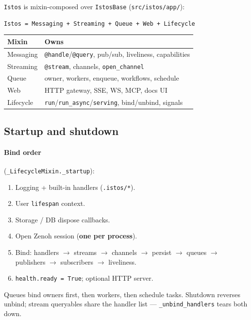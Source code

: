 \documentclass[11pt,a4paper]{article}
\begin{document}
\texttt{Istos} is mixin-composed over \texttt{IstosBase}
(\texttt{src/istos/app/}):

\begin{center}
\large\texttt{Istos = Messaging + Streaming + Queue + Web + Lifecycle}
\end{center}

\begin{tabularx}{\textwidth}{@{}lX@{}}
\toprule
\textbf{Mixin} & \textbf{Owns} \\
\midrule
Messaging & \texttt{@handle}/\texttt{@query}, pub/sub, liveliness, capabilities \\
Streaming & \texttt{@stream}, channels, \texttt{open\_channel} \\
Queue & owner, workers, enqueue, workflows, schedule \\
Web & HTTP gateway, SSE, WS, MCP, docs UI \\
Lifecycle & \texttt{run}/\texttt{run\_async}/\texttt{serving}, bind/unbind, signals \\
\bottomrule
\end{tabularx}

\subsection{Startup and shutdown}

\paragraph{Bind order} (\texttt{\_LifecycleMixin.\_startup}):
\begin{enumerate}[leftmargin=*,itemsep=1pt]
  \item Logging + built-in handlers (\texttt{.istos/*}).
  \item User \texttt{lifespan} context.
  \item Storage / DB dispose callbacks.
  \item Open Zenoh session (\textbf{one per process}).
  \item Bind: handlers $\to$ streams $\to$ channels $\to$ persist $\to$ queues
        $\to$ publishers $\to$ subscribers $\to$ liveliness.
  \item \texttt{health.ready = True}; optional HTTP server.
\end{enumerate}

Queues bind owners first, then workers, then schedule tasks. Shutdown reverses
unbind; stream queryables share the handler list --- \texttt{\_unbind\_handlers}
tears both down.
\end{document}
